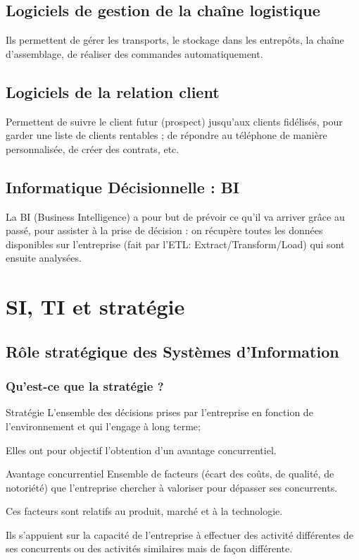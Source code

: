 \documentclass[10pt,a4paper,french]{article}
\begin{document}
\subsection{Logiciels de gestion de la chaîne logistique}

Ils permettent de gérer les transports, le stockage dans les entrepôts, la chaîne d'assemblage, de réaliser des commandes automatiquement.

\subsection{Logiciels de la relation client}

Permettent de suivre le client futur (prospect) jusqu'aux clients fidélisés, pour garder une liste de clients rentables ; de répondre au téléphone de manière personnalisée, de créer des contrats, etc.

\subsection{Informatique Décisionnelle : BI}

La BI (Business Intelligence) a pour but de prévoir ce qu'il va arriver grâce au passé, pour assister à la prise de décision : on récupère toutes les données disponibles sur l'entreprise (fait par l'ETL: Extract/Transform/Load) qui sont ensuite analysées.

\section{SI, TI et stratégie}

\subsection{Rôle stratégique des Systèmes d'Information}

\subsubsection{Qu'est-ce que la stratégie ?}

\begin{cquote}{Stratégie}
L'ensemble des décisions prises par l'entreprise en fonction de l’environnement et qui l'engage à long terme;

Elles ont pour objectif l'obtention d'un avantage concurrentiel.
\end{cquote}

\begin{cquote}{Avantage concurrentiel}
Ensemble de facteurs (écart des coûts, de qualité, de notoriété) que l'entreprise chercher à valoriser pour dépasser ses concurrents.

Ces facteurs sont relatifs au produit, marché et à la technologie.

Ils s'appuient sur la capacité de l'entreprise à effectuer des activité différentes de ses concurrents ou des activités similaires mais de façon différente.
\end{cquote}
\end{document}
